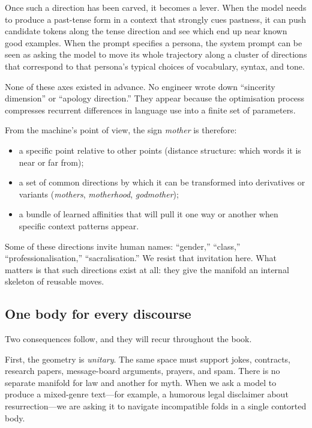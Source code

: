 \documentclass[12pt,a4paper]{article}
\begin{document}
Once such a direction has been carved, it becomes a lever. When the model needs to produce a past-tense form in a context that strongly cues pastness, it can push candidate tokens along the tense direction and see which end up near known good examples. When the prompt specifies a persona, the system prompt can be seen as asking the model to move its whole trajectory along a cluster of directions that correspond to that persona's typical choices of vocabulary, syntax, and tone.

None of these axes existed in advance. No engineer wrote down ``sincerity dimension'' or ``apology direction.'' They appear because the optimisation process compresses recurrent differences in language use into a finite set of parameters.

From the machine's point of view, the sign \emph{mother} is therefore:

\begin{itemize}
  \item a specific point relative to other points (distance structure: which words it is near or far from);
  \item a set of common directions by which it can be transformed into derivatives or variants (\emph{mothers}, \emph{motherhood}, \emph{godmother});
  \item a bundle of learned affinities that will pull it one way or another when specific context patterns appear.
\end{itemize}

Some of these directions invite human names: ``gender,'' ``class,'' ``professionalisation,'' ``sacralisation.'' We resist that invitation here. What matters is that such directions exist at all: they give the manifold an internal skeleton of reusable moves.

\subsection*{One body for every discourse}

Two consequences follow, and they will recur throughout the book.

First, the geometry is \emph{unitary}. The same space must support jokes, contracts, research papers, message-board arguments, prayers, and spam. There is no separate manifold for law and another for myth. When we ask a model to produce a mixed-genre text---for example, a humorous legal disclaimer about resurrection---we are asking it to navigate incompatible folds in a single contorted body.
\end{document}
